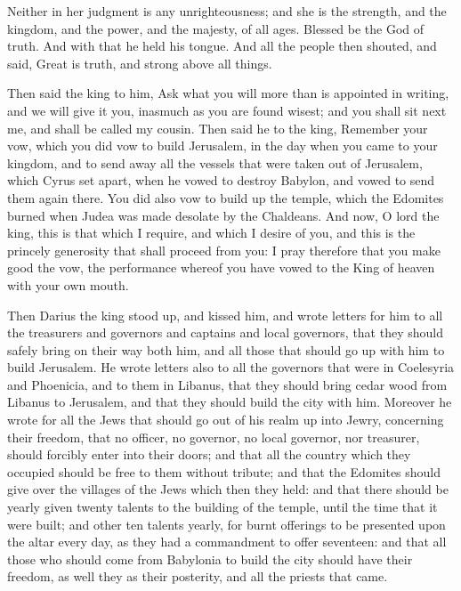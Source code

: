 {Neither in her judgment is any unrighteousness; and she is the strength, and the kingdom, and the power, and the majesty, of all ages. Blessed be the God of truth.
And with that he held his tongue. And all the people then shouted, and said, Great is truth, and strong above all things.
\par }{\PP {}Then said the king to him, Ask what you will more than is appointed in writing, and we will give it you, inasmuch as you are found wisest; and you shall sit next me, and shall be called my cousin.
Then said he to the king, Remember your vow, which you did vow to build Jerusalem, in the day when you came to your kingdom,
and to send away all the vessels that were taken out of Jerusalem, which Cyrus set apart, when he vowed to destroy Babylon, and vowed to send them again there.
You did also vow to build up the temple, which the Edomites burned when Judea was made desolate by the Chaldeans.
And now, O lord the king, this is that which I require, and which I desire of you, and this is the princely generosity that shall proceed from you: I pray therefore that you make good the vow, the performance whereof you have vowed to the King of heaven with your own mouth.
\par }{\PP {}Then Darius the king stood up, and kissed him, and wrote letters for him to all the treasurers and governors and captains and local governors, that they should safely bring on their way both him, and all those that should go up with him to build Jerusalem.
He wrote letters also to all the governors that were in Coelesyria and Phoenicia, and to them in Libanus, that they should bring cedar wood from Libanus to Jerusalem, and that they should build the city with him.
Moreover he wrote for all the Jews that should go out of his realm up into Jewry, concerning their freedom, that no officer, no governor, no local governor, nor treasurer, should forcibly enter into their doors;
and that all the country which they occupied should be free to them without tribute; and that the Edomites should give over the villages of the Jews which then they held:
and that there should be yearly given twenty talents to the building of the temple, until the time that it were built;
and other ten talents yearly, for burnt offerings to be presented upon the altar every day, as they had a commandment to offer seventeen:
and that all those who should come from Babylonia to build the city should have their freedom, as well they as their posterity, and all the priests that came.
}
